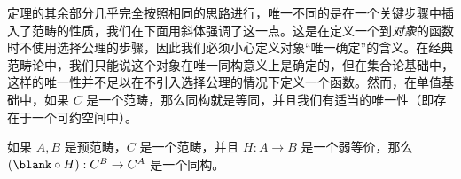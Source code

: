 定理的其余部分几乎完全按照相同的思路进行，唯一不同的是在一个关键步骤中插入了范畴的性质，我们在下面用斜体强调了这一点。这是在定义一个到\emph{对象}的函数时不使用选择公理的步骤，因此我们必须小心定义对象“唯一确定”的含义。在经典范畴论中，我们只能说这个对象在唯一同构意义上是确定的，但在集合论基础中，这样的唯一性并不足以在不引入选择公理的情况下定义一个函数。然而，在单值基础中，如果 $C$ 是一个范畴，那么同构就是等同，并且我们有适当的唯一性（即存在于一个可约空间中）。

%

\begin{thm}\label{ct:cat-weq-eq}
如果 $A,B$ 是预范畴，$C$ 是一个范畴，并且 $H:A\to B$ 是一个弱等价，那么 $(\blank\circ H):C^B \to C^A$ 是一个同构。
\end{thm}
